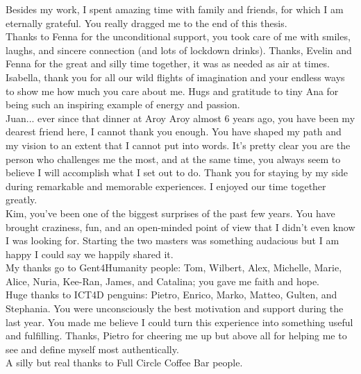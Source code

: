 \begin{acknowledgements}
Besides my work, I spent amazing time with family and friends, for which I am eternally grateful. You really dragged me to the end of this thesis. \\
Thanks to Fenna for the unconditional support, you took care of me with smiles, laughs, and sincere connection (and lots of lockdown drinks). Thanks, Evelin and Fenna for the great and silly time together, it was as needed as air at times. \\Isabella, thank you for all our wild flights of imagination and your endless ways to show me how much you care about me. Hugs and gratitude to tiny Ana for being such an inspiring example of energy and passion. \\
Juan... ever since that dinner at Aroy Aroy almost 6 years ago, you have been my dearest friend here, I cannot thank you enough. You have shaped my path and my vision to an extent that I cannot put into words. It's pretty clear you are the person who challenges me the most, and at the same time, you always seem to believe I will accomplish what I set out to do. Thank you for staying by my side during remarkable and memorable experiences. I enjoyed our time together greatly. \\
Kim, you've been one of the biggest surprises of the past few years. You have brought craziness, fun, and an open-minded point of view that I didn't even know I was looking for. Starting the two masters was something audacious but I am happy I could say we happily shared it.\\
My thanks go to Gent4Humanity people: Tom, Wilbert, Alex, Michelle, Marie, Alice, Nuria, Kee-Ran, James, and Catalina; you gave me faith and hope. \\
Huge thanks to ICT4D penguins: Pietro, Enrico, Marko, Matteo, Gulten, and Stephania. You were unconsciously the best motivation and support during the last year. You made me believe I could turn this experience into something useful and fulfilling. Thanks, Pietro for cheering me up but above all for helping me to see and define myself most authentically.\\
A silly but real thanks to Full Circle Coffee Bar people.\\


\end{acknowledgements}
